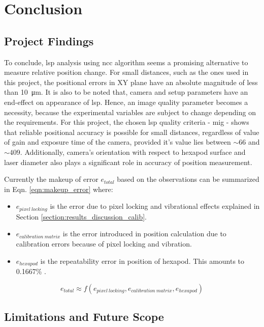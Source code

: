 \chapter{Conclusion}

\section*{Project Findings}

To conclude, \gls{lsp} analysis using \gls{ncc} algorithm seems a promising alternative to measure relative position change. For small distances, such as the ones used in this project, the positional errors in XY plane have an absolute magnitude of less than \SI{10}{\micro\meter}. It is also to be noted that, camera and setup parameters have an end-effect on appearance of \gls{lsp}. Hence, an image quality parameter becomes a necessity, because the experimental variables are subject to change depending on the requirements. For this project, the chosen \gls{lsp} quality criteria - \gls{mig} - shows that reliable positional accuracy is possible for small distances, regardless of value of gain and exposure time of the camera, provided it's value lies between $\sim66$ and $\sim409$. Additionally, camera's orientation with respect to hexapod surface and laser diameter also plays a significant role in accuracy of position measurement. 

\vspace{5mm}
\noindent Currently the makeup of error $e_{total}$ based on the observations can be summarized in Eqn. \ref{eqn:makeup_error} where:

\begin{itemize}
    \item $e_{pixel\ locking}$ is the error due to pixel locking and vibrational effects explained in Section \ref{section:results_discussion_calib}. 
    \item $e_{calibration\ matrix}$ is the error introduced in position calculation due to calibration errors because of pixel locking and vibration.
    \item $e_{hexapod}$ is the repeatability error in position of hexapod. This amounts to 0.1667\% \cite{hexapod_manual}.
\end{itemize}
\begin{equation}
    e_{total} \approx f(e_{pixel\ locking}, e_{calibration\ matrix}, e_{hexapod})
    \label{eqn:makeup_error}
\end{equation}

\section*{Limitations and Future Scope}  

